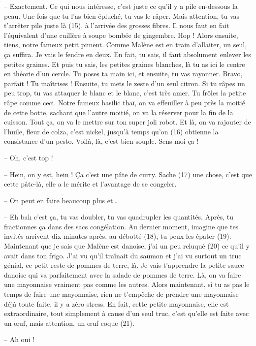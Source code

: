 \documentclass[11pt, french]{report}
\begin{document}
-- Exactement. Ce qui nous intéresse, c’est juste ce qu’il y a pile en-dessous
la peau. Une fois que tu l’as bien épluché, tu vas le râper. Mais attention, tu
vas t’arrêter pile juste là (15), à l’arrivée des grosses fibres. Il nous faut
en fait l’équivalent d’une cuillère à soupe bombée de gingembre. Hop ! Alors
ensuite, tiens, notre fameux petit piment. Comme Malène est en train d’allaiter,
un seul, ça suffira. Je vais le fendre en deux. En fait, tu sais, il faut
absolument enlever les petites graines. Et puis tu sais, les petites graines
blanches, là tu as ici le centre en théorie d’un cercle. Tu poses ta main ici,
et ensuite, tu vas rayonner. Bravo, parfait ! Tu maîtrises ! Ensuite, tu mets le
zeste d’un seul citron. Si tu râpes un peu trop, tu vas attaquer le blanc et le
blanc, c’est très amer. Tu frôles la petite râpe comme ceci. Notre fameux basilic
thaï, on va effeuiller à peu près la moitié de cette botte, sachant que l’autre
moitié, on va la réserver pour la fin de la cuisson. Tout ça, on va le mettre sur
ton super joli robot. Et là, on va rajouter de l’huile, fleur de colza, c’est
nickel, jusqu’à temps qu’on (16) obtienne la consistance d’un pesto. Voilà, là,
c’est bien souple. Sens-moi ça !

-- Oh, c’est top !

-- Hein, on y est, hein ! Ça c’est une pâte de curry. Sache (17) une chose, c’est
que cette pâte-là, elle a le mérite et l’avantage de se congeler.

-- On peut en faire beaucoup plus et…

-- Eh bah c’est ça, tu vas doubler, tu vas quadrupler les quantités. Après, tu
fractionnes ça dans des sacs congélation. Au dernier moment, imagine que tes
invités arrivent dix minutes après, au débotté (18), tu peux les épater (19).
Maintenant que je sais que Malène est danoise, j’ai un peu reluqué (20) ce qu’il
y avait dans ton frigo. J’ai vu qu’il traînait du saumon et j’ai vu surtout un
truc génial, ce petit reste de pommes de terre, là. Je vais t’apprendre la petite
sauce danoise qui va parfaitement avec la salade de pommes de terre. Là, on va
faire une mayonnaise vraiment pas comme les autres. Alors maintenant, si tu as
pas le temps de faire une mayonnaise, rien ne t’empêche de prendre une mayonnaise
déjà toute faite, il y a zéro stress. En fait, cette petite mayonnaise, elle est
extraordinaire, tout simplement à cause d’un seul truc, c’est qu’elle est faite
avec un œuf, mais attention, un œuf coque (21).

-- Ah oui !
\end{document}
